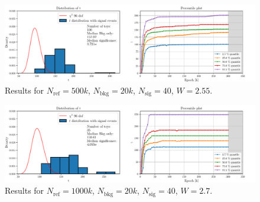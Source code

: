 \vspace{-5mm}
\begin{figure}[H]
	\centering
	\includegraphics[width=1.0\textwidth]{Python/RESULTS/ref500000_bkg20000_sig40/data_ref500000_bkg20000_sig40_wclip2-55.pdf}
	\caption{Results for $N_\mathrm{ref}=500\si{k}$, $N_\mathrm{bkg}=20\si{k}$, $N_\mathrm{sig}=40$, $W=2.55$.}
	\label{fig:REF500000_BKG20000_SIG40_WCLIP2.55}
\end{figure}
\vspace{-5mm}
\begin{figure}[H]
	\centering
	\includegraphics[width=1.0\textwidth]{Python/RESULTS/ref1000000_bkg20000_sig40/data_ref1000000_bkg20000_sig40_wclip2-7.pdf}
	\caption{Results for $N_\mathrm{ref}=1000\si{k}$, $N_\mathrm{bkg}=20\si{k}$, $N_\mathrm{sig}=40$, $W=2.7$.}
	\label{fig:REF1000000_BKG20000_SIG40_WCLIP2.7}
\end{figure}





